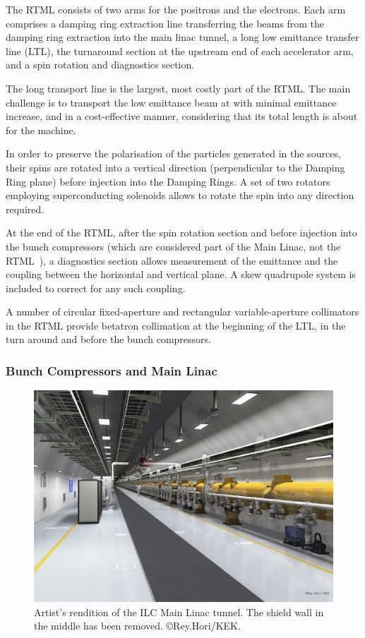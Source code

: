 The RTML consists of two arms for the positrons and the electrons. 
Each arm comprises a damping ring extraction line transferring the beams from the damping ring extraction into the main linac tunnel, a long low emittance transfer line (LTL), the turnaround section at the upstream end of each accelerator arm, and a spin rotation and diagnostics section.

The long transport line is the largest, most costly part of the RTML.
The main challenge is to transport the low emittance beam at  with minimal emittance increase, and in a cost-effective manner, considering that its total length is about  for the  machine.

In order to preserve the polarisation of the particles generated in the sources, their spins are rotated into a vertical direction (perpendicular to the Damping Ring plane) before injection into the Damping Rings. 
A set of two rotators~\cite{Emma:1995kf} employing superconducting solenoids allows to rotate the spin into any direction required.

At the end of the RTML, after the spin rotation section and before injection into the bunch compressors (which are considered part of the Main Linac, not the RTML~\cite{bib:cr-0010}), a diagnostics section allows measurement of  the emittance and the  coupling between the  horizontal and vertical plane.
A skew quadrupole system is included to correct for any such coupling.

A number of circular fixed-aperture and rectangular variable-aperture collimators in the RTML provide betatron collimation at the beginning of the LTL, in the turn around and before the bunch compressors.


\subsubsection{Bunch Compressors and Main Linac}

\begin{figure}[htbp]
   \includegraphics[width=\hsize]{chapters/figures/ILC2016_tunnel_A1_160826-low4}
\caption{Artist's rendition of the ILC Main Linac tunnel. The shield wall in the middle has been removed.
\copyright Rey.Hori/KEK.}
\label{fig:ilc-tunnel}
\end{figure}

